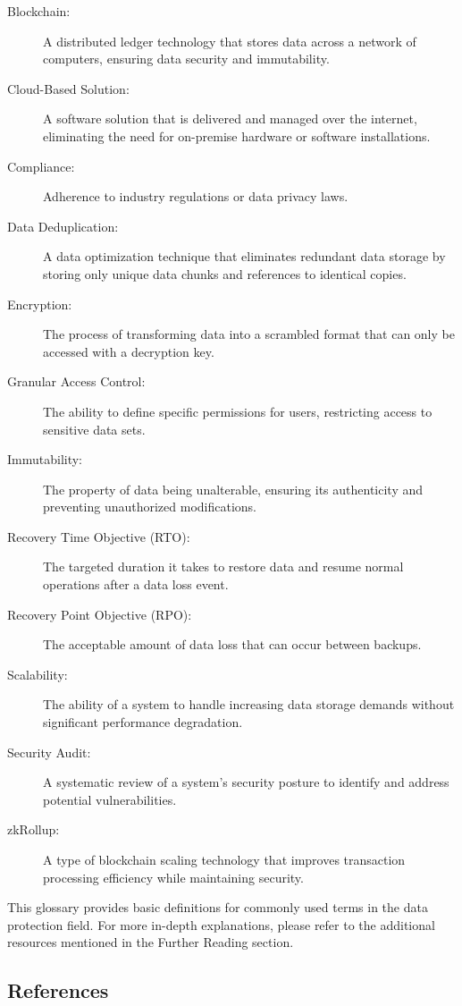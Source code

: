 \documentclass[12pt]{article}
\begin{document}
\begin{description}
    \item[Blockchain:] A distributed ledger technology that stores data across a network of computers, ensuring data security and immutability.
    \item[Cloud-Based Solution:] A software solution that is delivered and managed over the internet, eliminating the need for on-premise hardware or software installations.
    \item[Compliance:] Adherence to industry regulations or data privacy laws.
    \item[Data Deduplication:] A data optimization technique that eliminates redundant data storage by storing only unique data chunks and references to identical copies.
    \item[Encryption:] The process of transforming data into a scrambled format that can only be accessed with a decryption key.
    \item[Granular Access Control:] The ability to define specific permissions for users, restricting access to sensitive data sets.
    \item[Immutability:] The property of data being unalterable, ensuring its authenticity and preventing unauthorized modifications.
    \item[Recovery Time Objective (RTO):] The targeted duration it takes to restore data and resume normal operations after a data loss event.
    \item[Recovery Point Objective (RPO):] The acceptable amount of data loss that can occur between backups.
    \item[Scalability:] The ability of a system to handle increasing data storage demands without significant performance degradation.
    \item[Security Audit:] A systematic review of a system's security posture to identify and address potential vulnerabilities.
    \item[zkRollup:] A type of blockchain scaling technology that improves transaction processing efficiency while maintaining security.
\end{description}

This glossary provides basic definitions for commonly used terms in the data protection field. For more in-depth explanations, please refer to the additional resources mentioned in the Further Reading section.

\subsection*{References}
\end{document}
